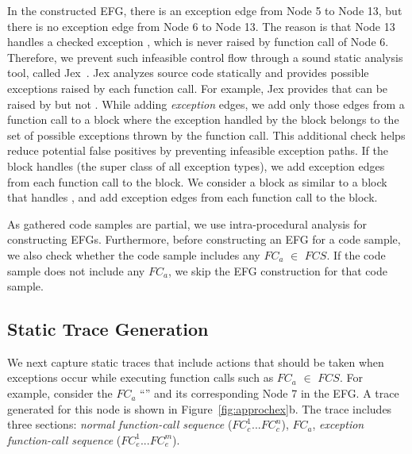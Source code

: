 In the constructed EFG, there is an exception edge from Node 5 to Node 13,
but there is no exception edge from Node 6 to Node 13. The reason is that Node 13
handles a checked exception , which is never raised by
function call  of Node 6. 
Therefore, we prevent such infeasible control flow through a sound
static analysis tool, called Jex~\cite{Jex:Robillard}.
Jex analyzes source code statically and provides possible exceptions raised by each function call. 
For example, Jex provides that  can be raised by
 but not .
While adding \emph{exception} edges, we add only those edges
from a function call to a  block where 
the exception handled by the  block
belongs to the set of possible exceptions thrown by the function call. 
This additional check helps reduce potential false positives by preventing
infeasible exception paths. If the  block
handles  (the super class of all exception types), we add 
exception edges from each function call to the  block.
We consider a  block as similar to 
a  block that handles , and 
add exception edges from each function call to the  block.

As gathered code samples are partial, we use intra-procedural 
analysis for constructing EFGs. Furthermore, before constructing an EFG
for a code sample, we also check whether the code sample includes
any $FC_a$ $\in$ $FCS$. If the code sample does not include any $FC_a$,
we skip the EFG construction for that code sample.
\vspace*{-2ex}
\subsection{Static Trace Generation}
\vspace*{-2ex}

We next capture static traces that include
actions that should be taken when exceptions occur while executing
function calls such as $FC_a$ $\in$ $FCS$. For example, consider
the $FC_a$ ``'' and its corresponding
Node 7 in the EFG. A trace generated for this node is shown in Figure~\ref{fig:approchex}b.
The trace includes three sections: \emph{normal function-call
sequence} ($FC_c^1$...$FC_c^n$), $FC_a$, \emph{exception function-call sequence} ($FC_e^1$...$FC_e^m$).

